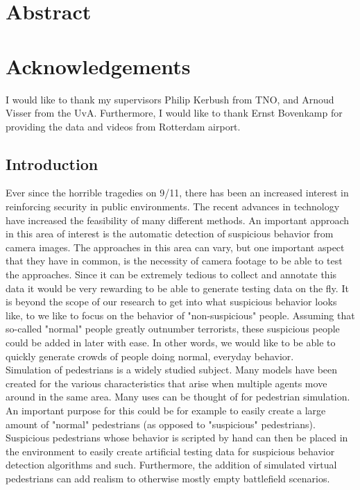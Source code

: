\documentclass[11pt]{book}
\begin{document}
\listoftodos
\maketitle
 \chapter*{\centering Abstract}
\maketitle
\newpage
 \chapter*{\centering Acknowledgements}
\maketitle
I would like to thank my supervisors Philip Kerbush from TNO, and Arnoud Visser from the UvA. Furthermore, I would like to thank Ernst Bovenkamp for providing the data and videos from Rotterdam airport.
\newpage
\tableofcontents
\newpage

\section{Introduction}
Ever since the horrible tragedies on 9/11, there has been an increased interest in reinforcing security in public environments. The recent advances in technology have increased the feasibility of many different methods. An important approach in this area of interest is the automatic detection of suspicious behavior from camera images. The approaches in this area can vary, but one important aspect that they have in common, is the necessity of camera footage to be able to test the approaches. Since it can be extremely tedious to collect and annotate this data it would be very rewarding to be able to generate testing data on the fly. It is beyond the scope of our research to get into what suspicious behavior looks like, to we like to focus on the behavior of "non-suspicious" people. Assuming that so-called "normal" people greatly outnumber terrorists, these suspicious people could be added in later with ease. In other words, we would like to be able to quickly generate crowds of people doing normal, everyday behavior.\\
Simulation of pedestrians is a widely studied subject. Many models have been created for the various characteristics that arise when multiple agents move around in the same area. Many uses can be thought of for pedestrian simulation. An important purpose for this could be for example to easily create a large amount of "normal" pedestrians (as opposed to "suspicious" pedestrians).  Suspicious pedestrians whose behavior is scripted by hand can then be placed in the environment to easily create artificial testing data for suspicious behavior detection algorithms and such. Furthermore, the addition of simulated virtual pedestrians can add realism to otherwise mostly empty battlefield scenarios.
\end{document}
